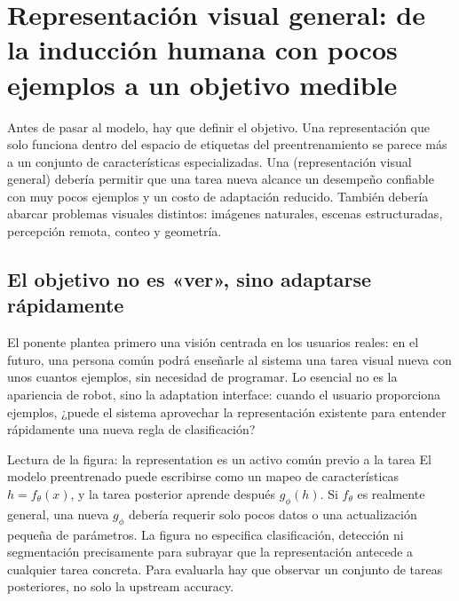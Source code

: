\section{Representación visual general: de la inducción humana con pocos ejemplos a un objetivo medible}

Antes de pasar al modelo, hay que definir el objetivo. Una representación que solo funciona dentro del espacio de etiquetas del preentrenamiento se parece más a un conjunto de características especializadas. Una  (representación visual general) debería permitir que una tarea nueva alcance un desempeño confiable con muy pocos ejemplos y un costo de adaptación reducido. También debería abarcar problemas visuales distintos: imágenes naturales, escenas estructuradas, percepción remota, conteo y geometría.

\subsection{El objetivo no es «ver», sino adaptarse rápidamente}

El ponente plantea primero una visión centrada en los usuarios reales: en el futuro, una persona común podrá enseñarle al sistema una tarea visual nueva con unos cuantos ejemplos, sin necesidad de programar. Lo esencial no es la apariencia de robot, sino la adaptation interface: cuando el usuario proporciona ejemplos, ¿puede el sistema aprovechar la representación existente para entender rápidamente una nueva regla de clasificación?


\begin{knowledgebox}{Lectura de la figura: la representation es un activo común previo a la tarea}
El modelo preentrenado puede escribirse como un mapeo de características $h=f_{\theta}(x)$, y la tarea posterior aprende después $g_{\phi}(h)$. Si $f_{\theta}$ es realmente general, una nueva $g_{\phi}$ debería requerir solo pocos datos o una actualización pequeña de parámetros. La figura no especifica clasificación, detección ni segmentación precisamente para subrayar que la representación antecede a cualquier tarea concreta. Para evaluarla hay que observar un conjunto de tareas posteriores, no solo la upstream accuracy.
\end{knowledgebox}


